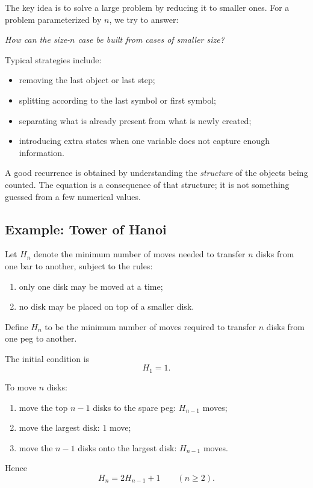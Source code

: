 The key idea is to solve a large problem by reducing it to smaller ones. For a problem parameterized by $n$, we try to answer:
\begin{center}
\emph{How can the size-$n$ case be built from cases of smaller size?}
\end{center}

Typical strategies include:
\begin{itemize}[leftmargin=*]
    \item removing the last object or last step;
    \item splitting according to the last symbol or first symbol;
    \item separating what is already present from what is newly created;
    \item introducing extra states when one variable does not capture enough information.
\end{itemize}

\begin{extension}[title={Recurrence modelling is structural, not computational}]
A good recurrence is obtained by understanding the \emph{structure} of the objects being counted. The equation is a consequence of that structure; it is not something guessed from a few numerical values.
\end{extension}

\subsection{Example: Tower of Hanoi}

Let $H_n$ denote the minimum number of moves needed to transfer $n$ disks from one bar to another, subject to the rules:
\begin{enumerate}[leftmargin=*]
    \item only one disk may be moved at a time;
    \item no disk may be placed on top of a smaller disk.
\end{enumerate}

\begin{examplebox}[title={Tower of Hanoi recurrence}]
Define $H_n$ to be the minimum number of moves required to transfer $n$ disks from one peg to another.

The initial condition is
\[
H_1=1.
\]

To move $n$ disks:
\begin{enumerate}[leftmargin=*]
    \item move the top $n-1$ disks to the spare peg: $H_{n-1}$ moves;
    \item move the largest disk: $1$ move;
    \item move the $n-1$ disks onto the largest disk: $H_{n-1}$ moves.
\end{enumerate}
Hence
\[
H_n=2H_{n-1}+1
\qquad (n\ge 2).
\]
\end{examplebox}

